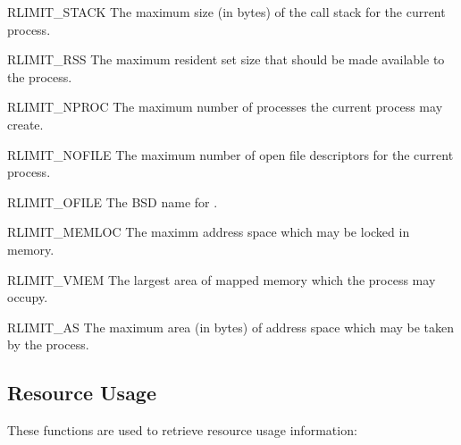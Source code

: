 \begin{datadesc}{RLIMIT_STACK}
  The maximum size (in bytes) of the call stack for the current
  process.
\end{datadesc}

\begin{datadesc}{RLIMIT_RSS}
  The maximum resident set size that should be made available to the
  process.
\end{datadesc}

\begin{datadesc}{RLIMIT_NPROC}
  The maximum number of processes the current process may create.
\end{datadesc}

\begin{datadesc}{RLIMIT_NOFILE}
  The maximum number of open file descriptors for the current
  process.
\end{datadesc}

\begin{datadesc}{RLIMIT_OFILE}
  The BSD name for .
\end{datadesc}

\begin{datadesc}{RLIMIT_MEMLOC}
  The maximm address space which may be locked in memory.
\end{datadesc}

\begin{datadesc}{RLIMIT_VMEM}
  The largest area of mapped memory which the process may occupy.
\end{datadesc}

\begin{datadesc}{RLIMIT_AS}
  The maximum area (in bytes) of address space which may be taken by
  the process.
\end{datadesc}

\subsection{Resource Usage}

These functions are used to retrieve resource usage information:

